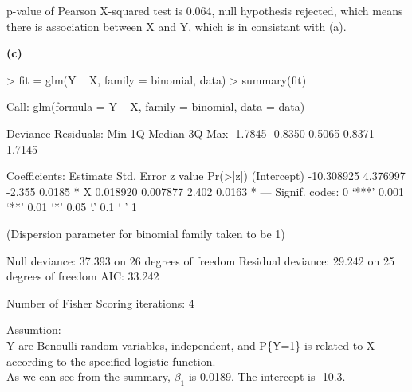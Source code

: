 \documentclass[a4paper]{article}
\renewcommand{\part}[1] {\vspace{.10in} {\bf (#1)}}
\begin{document}
{\color{red}
p-value of Pearson X-squared test is 0.064, null hypothesis rejected, which means there is association between X and Y, which is in consistant with (a).
}


\part{c}
\begin{Schunk}
\begin{Sinput}
> fit = glm(Y ~ X, family = binomial, data)
> summary(fit)
\end{Sinput}
\begin{Soutput}
Call:
glm(formula = Y ~ X, family = binomial, data = data)

Deviance Residuals: 
    Min       1Q   Median       3Q      Max  
-1.7845  -0.8350   0.5065   0.8371   1.7145  

Coefficients:
              Estimate Std. Error z value Pr(>|z|)  
(Intercept) -10.308925   4.376997  -2.355   0.0185 *
X             0.018920   0.007877   2.402   0.0163 *
---
Signif. codes:  0 ‘***’ 0.001 ‘**’ 0.01 ‘*’ 0.05 ‘.’ 0.1 ‘ ’ 1

(Dispersion parameter for binomial family taken to be 1)

    Null deviance: 37.393  on 26  degrees of freedom
Residual deviance: 29.242  on 25  degrees of freedom
AIC: 33.242

Number of Fisher Scoring iterations: 4
\end{Soutput}
\end{Schunk}
{\color{red}
Assumtion:\\
Y are Benoulli random variables, independent, and P\{Y=1\} is related to X according to the specified logistic function.\\
As we can see from the summary, $\beta_1$ is 0.0189. The intercept is -10.3.
}
\end{document}
